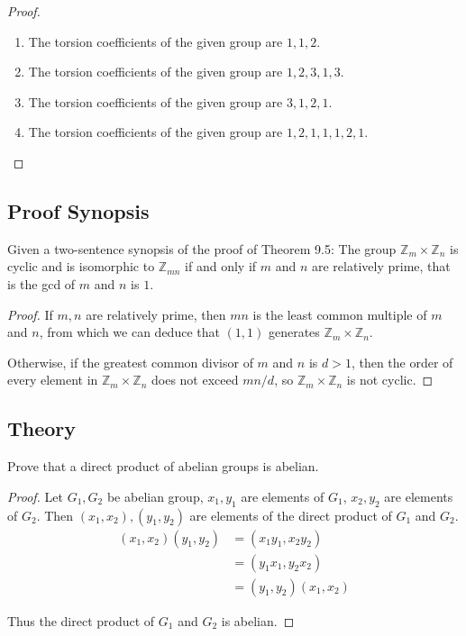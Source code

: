 \begin{proof}
    \begin{enumerate}[label={\textbf{\alph*.}}]
        \item The torsion coefficients of the given group are $1, 1, 2$.
        \item The torsion coefficients of the given group are $1, 2, 3, 1, 3$.
        \item The torsion coefficients of the given group are $3, 1, 2, 1$.
        \item The torsion coefficients of the given group are $1, 2, 1, 1, 1, 2, 1$.
    \end{enumerate}
\end{proof}

\subsection*{Proof Synopsis}

\begin{exercise}
    Given a two-sentence synopsis of the proof of Theorem 9.5: The group $\mathbb{Z}_{m}\times \mathbb{Z}_{n}$ is cyclic and is isomorphic to $\mathbb{Z}_{mn}$ if and only if $m$ and $n$ are relatively prime, that is the gcd of $m$ and $n$ is $1$.
\end{exercise}

\begin{proof}
    If $m, n$ are relatively prime, then $mn$ is the least common multiple of $m$ and $n$, from which we can deduce that $(1,1)$ generates $\mathbb{Z}_{m}\times\mathbb{Z}_{n}$.

    Otherwise, if the greatest common divisor of $m$ and $n$ is $d > 1$, then the order of every element in $\mathbb{Z}_{m}\times\mathbb{Z}_{n}$ does not exceed $mn/d$, so $\mathbb{Z}_{m}\times\mathbb{Z}_{n}$ is not cyclic.
\end{proof}

\subsection*{Theory}

\begin{exercise}
    Prove that a direct product of abelian groups is abelian.
\end{exercise}

\begin{proof}
    Let $G_{1}, G_{2}$ be abelian group, $x_{1}, y_{1}$ are elements of $G_{1}$, $x_{2}, y_{2}$ are elements of $G_{2}$. Then $(x_{1}, x_{2}), (y_{1}, y_{2})$ are elements of the direct product of $G_{1}$ and $G_{2}$.
    \begin{align*}
        (x_{1}, x_{2})(y_{1}, y_{2}) & = (x_{1}y_{1}, x_{2}y_{2})     \\
                                     & = (y_{1}x_{1}, y_{2}x_{2})     \\
                                     & = (y_{1}, y_{2})(x_{1}, x_{2})
    \end{align*}

    Thus the direct product of $G_{1}$ and $G_{2}$ is abelian.
\end{proof}

